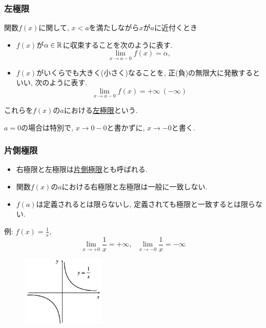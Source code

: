 

\begin{frame}
\frametitle{左極限}

\begin{Def}
関数$f(x)$に関して, $x < a$を満たしながら$x$が$a$に近付くとき
\begin{itemize}
\item $f(x)$が$\alpha \in \mathbb{R}$に収束することを次のように表す. 
$$
\lim_{x \to a -0} f(x)=\alpha, 
$$
\item $f(x)$がいくらでも大きく(小さく)なることを, 正(負)の無限大に発散するといい, 次のように表す. 
$$
\lim_{x \to a -0} f(x)=+\infty \ (-\infty)
$$
\end{itemize}
これらを$f(x)$の$a$における\underline{左極限}という. 
\end{Def}

$a=0$の場合は特別で, $x \to 0-0$と書かずに, $x\to -0$と書く. 

\end{frame}



\begin{frame}
\frametitle{片側極限}

\begin{itemize}
\item 右極限と左極限は\underline{片側極限}とも呼ばれる. 
\item 関数$f(x)$の$a$における右極限と左極限は一般に一致しない. 
\item $f(a)$は定義されるとは限らないし, 定義されても極限と一致するとは限らない. 
\end{itemize}
例: $f(x)=\frac{1}{x}$, \vspace{-2mm}
$$
\lim_{x \to +0}\frac{1}{x}= +\infty, \ \ \ \lim_{x \to -0}\frac{1}{x}=-\infty
$$

\vspace{-3mm}

 \begin{figure}[htbp]
 \begin{center} 
  \includegraphics[width=40mm]{calculus3/xinv.png}
 \end{center}
\end{figure}

\vspace{-3mm}

\end{frame}





